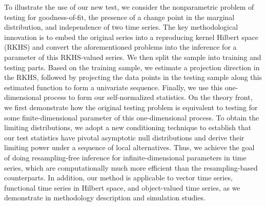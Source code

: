 \documentclass[11pt]{article}
\theoremstyle{plain}
\theoremstyle{definition}
\theoremstyle{remark}
\begin{document}
\indent To illustrate the use of our new test, we consider the nonparametric problem of testing for goodness-of-fit, the presence of a change point in the marginal distribution,  and independence of two time series. The key methodological innovation is to embed the original series into a reproducing kernel Hilbert space (RKHS) and convert the aforementioned problems into the inference for a parameter of this RKHS-valued series. We then split the sample into training and testing parts. Based on the training sample, we estimate a projection direction in the RKHS, followed by projecting the data points in the testing sample along this estimated function to form a univariate sequence.  Finally, we use this one-dimensional process to form our self-normalized statistics. On the theory front, we first demonstrate how the original testing problem is equivalent to testing for some finite-dimensional parameter of this one-dimensional process. To obtain the limiting distributions, we adopt a new conditioning technique to establish that our test statistics have pivotal asymptotic null distributions and derive their limiting power under a sequence of local alternatives. Thus, we achieve the goal of doing resampling-free inference for infinite-dimensional parameters in time series, which are computationally much more efficient than the resampling-based counterparts. In addition, our method is applicable to vector time series,   functional time series in Hilbert space, and object-valued time series, as we demonstrate in methodology description and simulation studies. \\
\end{document}
